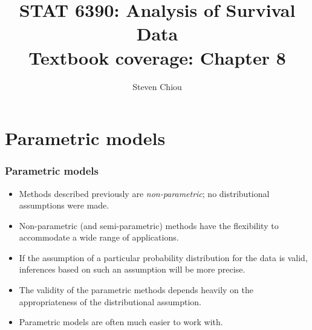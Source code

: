 \documentclass[10pt]{beamer}\usepackage[]{graphicx}\usepackage[]{color}
\title[STAT 6390]{STAT 6390: Analysis of Survival Data\\
  \small{Textbook coverage: Chapter 8}\\}
\author[Steven Chiou]{Steven Chiou}
\institute[UTD]{Department of Mathematical Sciences, \\ University of Texas at Dallas}
\date{}
\newcommand{\empr}[1]{{\emph{\color{red}#1}}}
\begin{document}
\begin{frame}[fragile]
  \titlepage

\end{frame}

\bgroup
{}

\section{Parametric models}

\begin{frame}
  \frametitle{Parametric models}
  \begin{itemize}
  \item Methods described previously are \empr{non-parametric}; 
    no distributional assumptions were made.
  \item Non-parametric (and semi-parametric) methods have the flexibility to accommodate a wide range of applications.
  \item 
    If the assumption of a particular probability distribution for the data is valid,
    inferences based on such an assumption will be more precise. 
  \item 
    The validity of the parametric methods depends heavily on the appropriateness of the distributional assumption.
  \item 
    Parametric models are often much easier to work with. 
  \end{itemize}
\end{frame}
\end{document}
